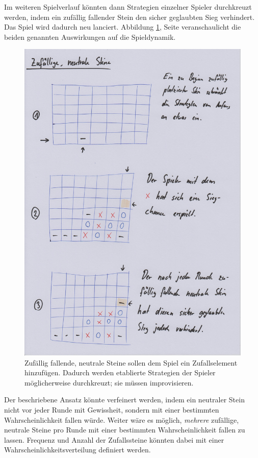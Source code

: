 \documentclass[a4paper,11pt,hidelinks]{scrartcl}
\newcommand{\imgref}[1]{{Abbildung \ref{#1}, Seite \pageref{#1}}}
\begin{document}
Im weiteren Spielverlauf könnten dann Strategien einzelner Spieler durchkreuzt werden, indem ein zufällig fallender Stein den sicher geglaubten Sieg verhindert. Das Spiel wird dadurch neu lanciert. \imgref{fig:neutral} veranschaulicht die beiden genannten Auswirkungen auf die Spieldynamik.

\begin{figure}
    \centering
    \includegraphics[width=0.9\linewidth]{pics/neutral-papier.jpg}
    \caption{Zufällig fallende, neutrale Steine sollen dem Spiel ein Zufallselement hinzufügen. Dadurch werden etablierte Strategien der Spieler möglicherweise durchkreuzt; sie müssen improvisieren.}
    \label{fig:neutral}
\end{figure}

Der beschriebene Ansatz könnte verfeinert werden, indem ein neutraler Stein nicht vor jeder Runde mit Gewissheit, sondern mit einer bestimmten Wahrscheinlichkeit fallen würde. Weiter wäre es möglich, \textit{mehrere} zufällige, neutrale Steine pro Runde mit einer bestimmten Wahrscheinlichkeit fallen zu lassen. Frequenz und Anzahl der Zufallssteine könnten dabei mit einer Wahrscheinlichkeitsverteilung definiert werden.
\end{document}
